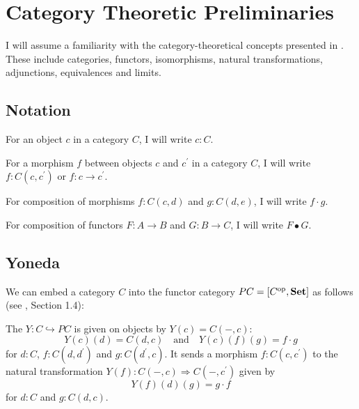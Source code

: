 \chapter{Category Theoretic Preliminaries}

I will assume a familiarity with the category-theoretical concepts presented in \cite{CT4P}. These include categories, functors, isomorphisms, natural transformations, adjunctions, equivalences and limits.

\section{Notation}
For an object $ c $ in a category $ C $, I will write $ c: C $.

For a morphism $ f $ between objects $ c $ and $ c^\prime $ in a category $ C $, I will write $ f: C(c, c^\prime) $ or $ f: c \to c^\prime $.

For composition of morphisms $ f: C(c, d) $ and $ g: C(d, e) $, I will write $ f \cdot g $.

For composition of functors $ F: A \to B $ and $ G: B \to C $, I will write $ F \bullet G $.

\section{Yoneda}
We can embed a category $ C $ into the functor category $ P C = [C^{\text{op}}, \mathbf{Set}] $ as follows (see \cite{Kashiwara}, Section 1.4):
\begin{definition}
  The  $ Y : C \hookrightarrow P C $ is given on objects by $ Y(c) = C(-, c) $:
  \[ Y(c)(d) = C(d, c) \quad \text{and} \quad Y(c)(f)(g) = f \cdot g \]
  for $ d: C $, $ f: C(d, d^\prime) $ and $ g: C(d^\prime, c) $. It sends a morphism $ f: C(c, c^\prime) $ to the natural transformation $ Y(f): C(-, c) \Rightarrow C(-, c^\prime) $ given by
  \[ Y(f)(d)(g) = g \cdot f \]
  for $ d: C $ and $ g: C(d, c) $.
\end{definition}


